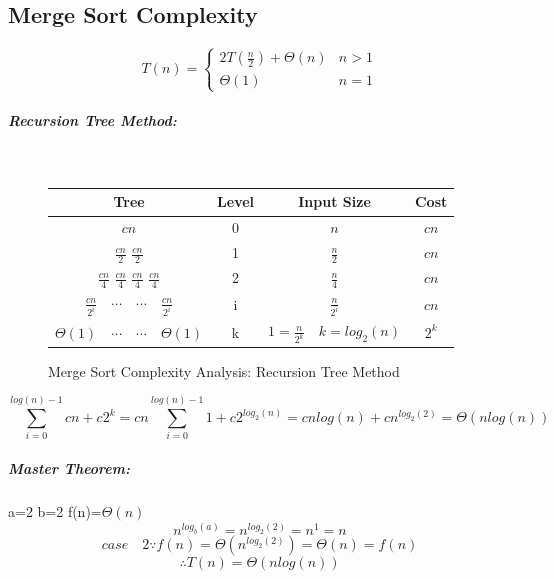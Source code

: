 \documentclass[12pt,letterpaper]{article}
\begin{document}
\subsection{Merge Sort Complexity}

\[T(n) = \begin{cases} 2T(\frac{n}{2})+\Theta(n) & n>1 \\ \Theta(1) & n=1 \end{cases}\]
\subparagraph{Recursion Tree Method:} \quad \\
\begin{figure}[h]
\centering
\begin{tabular}{|c|c|c|c|}
\hline
Tree & Level & Input Size & Cost\\
\hline 
\hline
$cn$ & 0 & $n$ & $cn$ \\ \hline
$\frac{cn}{2}$ \quad $\frac{cn}{2}$ & 1 & $\frac{n}{2}$ & $cn$ \\ \hline
$\frac{cn}{4}$ \quad $\frac{cn}{4}$ \quad $\frac{cn}{4}$ \quad $\frac{cn}{4}$ & 2 & $\frac{n}{4}$ & $cn$ \\ \hline
$\frac{cn}{2^i} \quad \cdots \quad \cdots \quad \frac{cn}{2^i}$ & i & $\frac{n}{2^i}$ & $cn$ \\ \hline
$\Theta (1) \quad \cdots \quad \cdots \quad \Theta (1)$ & k & $1=\frac{n}{2^k} \quad k=log_2(n) $ & $ 2^k$ \\ \hline
\end{tabular}
\caption{Merge Sort Complexity Analysis: Recursion Tree Method}
\end{figure}
$$ \sum_{i=0}^{log(n)-1}cn+c2^k=cn\sum_{i=0}^{log(n)-1}1+c2^{log_2(n)}=cnlog(n)+cn^{log_2(2)}=\Theta(nlog(n)) $$
\subparagraph{Master Theorem:} a=2 b=2 f(n)=$\Theta(n)$
\[n^{log_b(a)}=n^{log_2(2)}=n^1=n\]
\[case \quad 2 \because f(n)=\Theta(n^{log_2(2)})=\Theta(n)=f(n)\]
\[ \therefore T(n)=\Theta(nlog(n))\]
\end{document}
